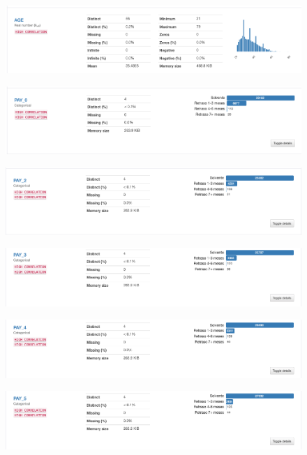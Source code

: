 \begin{figure}[H]
	\centering
	\includegraphics[scale=0.4]{Images/7}
\end{figure}\begin{figure}[H]
\centering
\includegraphics[scale=0.4]{Images/8}
\end{figure}\begin{figure}[H]
\centering
\includegraphics[scale=0.4]{Images/9}
\end{figure}\begin{figure}[H]
\centering
\includegraphics[scale=0.4]{Images/10}
\end{figure}
\begin{figure}[H]
	\centering
	\includegraphics[scale=0.4]{Images/11}
\end{figure}
\begin{figure}[H]
	\centering
	\includegraphics[scale=0.4]{Images/12}
\end{figure}
